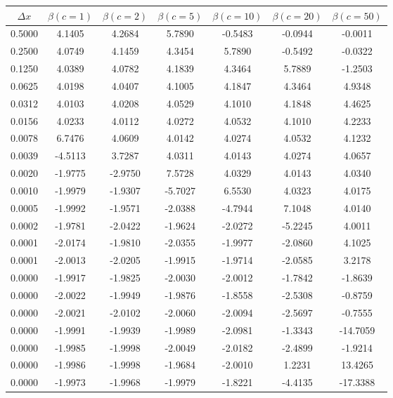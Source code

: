 \begin{tabular}{|c|c|c|c|c|c|c|}
\hline
\textbf{$\Delta x$}&\textbf{$\beta(c=1)$}&\textbf{$\beta(c=2)$}&\textbf{$\beta(c=5)$}&\textbf{$\beta(c=10)$}&\textbf{$\beta(c=20)$}&\textbf{$\beta(c=50)$}\\\hline
0.5000&4.1405&4.2684&5.7890&-0.5483&-0.0944&-0.0011\\\hline
0.2500&4.0749&4.1459&4.3454&5.7890&-0.5492&-0.0322\\\hline
0.1250&4.0389&4.0782&4.1839&4.3464&5.7889&-1.2503\\\hline
0.0625&4.0198&4.0407&4.1005&4.1847&4.3464&4.9348\\\hline
0.0312&4.0103&4.0208&4.0529&4.1010&4.1848&4.4625\\\hline
0.0156&4.0233&4.0112&4.0272&4.0532&4.1010&4.2233\\\hline
0.0078&6.7476&4.0609&4.0142&4.0274&4.0532&4.1232\\\hline
0.0039&-4.5113&3.7287&4.0311&4.0143&4.0274&4.0657\\\hline
0.0020&-1.9775&-2.9750&7.5728&4.0329&4.0143&4.0340\\\hline
0.0010&-1.9979&-1.9307&-5.7027&6.5530&4.0323&4.0175\\\hline
0.0005&-1.9992&-1.9571&-2.0388&-4.7944&7.1048&4.0140\\\hline
0.0002&-1.9781&-2.0422&-1.9624&-2.0272&-5.2245&4.0011\\\hline
0.0001&-2.0174&-1.9810&-2.0355&-1.9977&-2.0860&4.1025\\\hline
0.0001&-2.0013&-2.0205&-1.9915&-1.9714&-2.0585&3.2178\\\hline
0.0000&-1.9917&-1.9825&-2.0030&-2.0012&-1.7842&-1.8639\\\hline
0.0000&-2.0022&-1.9949&-1.9876&-1.8558&-2.5308&-0.8759\\\hline
0.0000&-2.0021&-2.0102&-2.0060&-2.0094&-2.5697&-0.7555\\\hline
0.0000&-1.9991&-1.9939&-1.9989&-2.0981&-1.3343&-14.7059\\\hline
0.0000&-1.9985&-1.9998&-2.0049&-2.0182&-2.4899&-1.9214\\\hline
0.0000&-1.9986&-1.9998&-1.9684&-2.0010&1.2231&13.4265\\\hline
0.0000&-1.9973&-1.9968&-1.9979&-1.8221&-4.4135&-17.3388\\\hline
\end{tabular}
